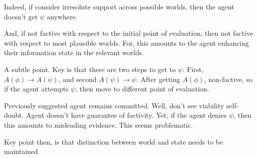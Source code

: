 \documentclass[10pt]{article}
\begin{document}
\begin{note}[Continuing]
  Indeed, if consider irresolute support across possible worlds, then the agent doesn't get \(\psi\) anywhere.

  And, if not factive with respect to the initial point of evaluation, then not factive with respect to most plausible worlds.
  For, this amounts to the agent enhancing their information state in the relevant worlds.

  A subtle point.
  Key is that there are two steps to get to \(\psi\).
  First, \(A(\phi) \rightarrow A(\psi)\), and second \(A(\psi) \rightarrow \psi\).
  After getting \(A(\phi)\), non-factive, so if the agent attempts \(\psi\), then move to different point of evaluation.

  Previously suggested agent remains committed.
  Well, don't see viability self-doubt.
  Agent doesn't have guarantee of factivity.
  Yet, if the agent denies \(\psi\), then this amounts to misleading evidence.
  This seems problematic.

  Key point then, is that distinction between world and state needs to be maintained.
\end{note}
\end{document}
